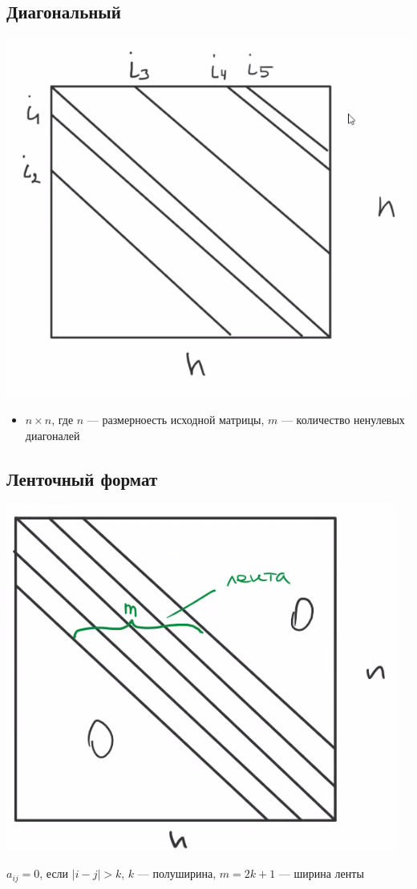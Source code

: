 \documentclass[oneside]{book}
\theoremstyle{plain}
\theoremstyle{remark}
\theoremstyle{definition}
\begin{document}
\subsection{Диагональный}
\label{sec:org51600e2}
\begin{center}
\includegraphics[scale=0.3]{10_1.png}
\end{center}
\begin{itemize}
\item \(n \times n\), где \(n\) --- размерноесть исходной матрицы, \(m\) --- количество ненулевых диагоналей
\end{itemize}
\subsection{Ленточный формат}
\label{sec:orgb1d0793}
\begin{center}
\includegraphics[scale=0.3]{10_2.png}
\end{center}
\(a_{ij} = 0\), если \(|i - j| > k\), \(k\) --- полуширина, \(m = 2k + 1\) --- ширина ленты
\end{document}
